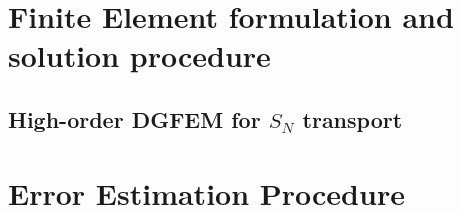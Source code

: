 \documentclass[preprint,10pt]{elsarticle}
\renewcommand{\(}{\left(}
\renewcommand{\)}{\right)}
\renewcommand{\[}{\left[}
\renewcommand{\]}{\right]}
\begin{document}
\section{Finite Element formulation and solution procedure} \label{sec:dgfem}
 

\subsection{High-order DGFEM for $S_N$ transport} \label{sec:dgfem-transport}



\section{Error Estimation Procedure} \label{sec:error}
\end{document}

